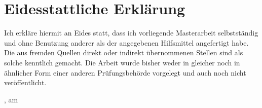 \chapter*{Eidesstattliche Erklärung}
Ich erkläre hiermit an Eides statt, dass ich vorliegende Masterarbeit selbstständig und ohne Benutzung anderer als der angegebenen Hilfsmittel angefertigt habe. Die aus fremden Quellen direkt oder indirekt übernommenen Stellen sind als solche kenntlich gemacht. Die Arbeit wurde bisher weder in gleicher noch in ähnlicher Form einer anderen Prüfungsbehörde vorgelegt und auch noch nicht veröffentlicht.

\vspace*{50mm}

\mysubmissiontown, am \mysubmissionday \hspace{1mm} \mysubmissionmonth \hspace{1mm} \mysubmissionyear \hfill \myauthor
